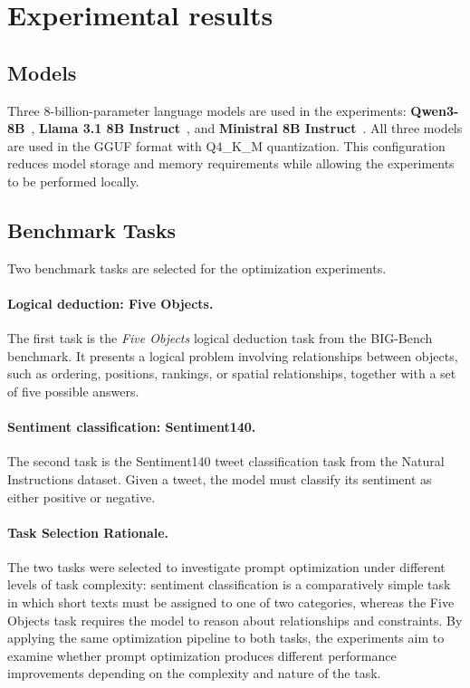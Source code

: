 \documentclass[pdflatex,sn-mathphys-num]{sn-jnl}%
\theoremstyle{thmstyleone}%
\theoremstyle{thmstyletwo}%
\theoremstyle{thmstylethree}%
\begin{document}
\section{Experimental results}

\subsection{Models}

Three 8-billion-parameter language models are used in the experiments: 
\textbf{Qwen3-8B}~\cite{hf-qwen}, \textbf{Llama 3.1 8B Instruct}~\cite{hf-llama}, 
and \textbf{Ministral 8B Instruct}~\cite{hf-ministral}. All three models 
are used in the GGUF format with Q4\_K\_M quantization. This configuration 
reduces model storage and memory requirements while allowing the experiments 
to be performed locally.

\subsection{Benchmark Tasks}

Two benchmark tasks are selected for the optimization experiments.

\paragraph{Logical deduction: Five Objects.}

The first task is the \textit{Five Objects} logical deduction task from the
BIG-Bench benchmark. It presents a logical problem involving relationships
between objects, such as ordering, positions, rankings, or spatial
relationships, together with a set of five possible answers.

\paragraph{Sentiment classification: Sentiment140.}

The second task is the Sentiment140 tweet classification task from the
Natural Instructions dataset. Given a tweet, the model must classify its
sentiment as either positive or negative.

\paragraph{Task Selection Rationale.}

The two tasks were selected to investigate prompt optimization under 
different levels of task complexity: sentiment classification is a 
comparatively simple task in which short texts must be assigned to one 
of two categories, whereas the Five Objects task requires the model to 
reason about relationships and constraints. 
By applying the same optimization pipeline to both tasks, the experiments 
aim to examine whether prompt optimization produces different performance 
improvements depending on the complexity and nature of the task.
\end{document}
